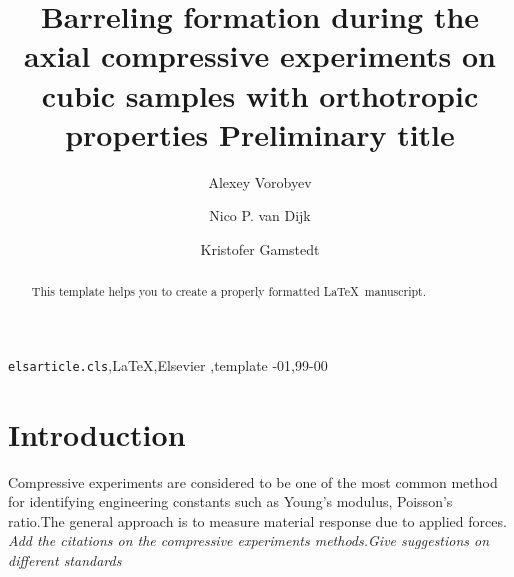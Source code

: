 \documentclass[review]{elsarticle}
\begin{document}
\begin{frontmatter}

\title{Barreling formation during the axial compressive experiments on cubic
samples with orthotropic properties {\color{red} Preliminary title}}








\author{Alexey Vorobyev}


\author{Nico P. van Dijk}
\author{Kristofer Gamstedt}

\address{Uppsala University, Division of Appplied Mechanics,
Uppsala, Sweden }



\begin{abstract}
This template helps you to create a properly formatted \LaTeX\ manuscript.
\end{abstract}

\begin{keyword}
\texttt{elsarticle.cls}\sep \LaTeX\sep Elsevier \sep template
-01\sep  99-00
\end{keyword}

\end{frontmatter}

\linenumbers

\section{Introduction}
Compressive experiments are considered to be one of the most common method for identifying engineering constants such as Young's
modulus, Poisson's ratio.The general approach is to measure material response 
due to applied forces. 
\\ \textit{\color {red} Add the citations on
the compressive experiments methods.Give suggestions on different standards}
\end{document}
